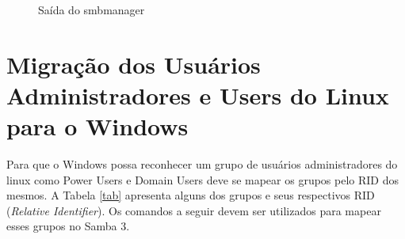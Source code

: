 \begin{figure}[ht]
   	\centering
   	\caption{Saída do smbmanager}
    \label{smbmanager}
\end{figure}

\section{Migração dos Usuários Administradores e Users do Linux para o Windows}

Para que o Windows possa reconhecer um grupo de usuários administradores do linux como Power Users e Domain Users deve se mapear os grupos pelo RID dos mesmos. A Tabela \ref{tab} apresenta alguns dos grupos e seus respectivos RID (\textit{Relative Identifier}). Os comandos a seguir devem ser utilizados para mapear esses grupos no Samba 3.

